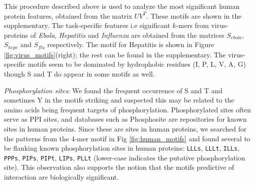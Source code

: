 \documentclass[a4paper,11pt]{article}
\begin{document}
This procedure described above is used to analyze the most significant human protein features, obtained from
the matrix $U V^T$. These motifs are shown in the supplementary. The task-specific features i.e significant $k$-mers from virus-proteins of \textit{Ebola}, \textit{Hepatitis} and \textit{Influenza} are obtained from the matrices $S_{ebola}$, $S_{hepc}$ and $S_{flu}$ respectively. The motif for Hepatitis is shown in Figure \ref{fig:virus_motifs}(right); the rest can be found in the supplementary. %
The virus-specific motifs seem to be dominated by hydrophobic residues (I, P, L, V, A, G) though S and T do appear in some motifs as well.




 \noindent\emph{Phosphorylation sites}: 
 We found the frequent occurrence of S and T and sometimes Y in the motifs striking and suspected this may be
 related to the amino acids being frequent targets of phosphorylation.
 Phosphorylated sites often serve as PPI sites, and databases such as Phosphosite \cite{phosphosite} are
  repositories for known sites in human proteins. Since these are sites in human proteins, we searched for the patterns
	from the 4-mer motif in Fig \ref{fig:human_motifs} and found several to be flanking known phosphorylation sites in human proteins:
	\texttt{LLLs}, \texttt{LLLt}, \texttt{ILLs}, \texttt{PPPs}, \texttt{PIPs}, \texttt{PIPt}, \texttt{LIPs}, \texttt{PLLt} (lower-case indicates the putative phosphorylation site). This observation also supports the notion that the motifs predictive
	of interaction are biologically significant.
\end{document}
